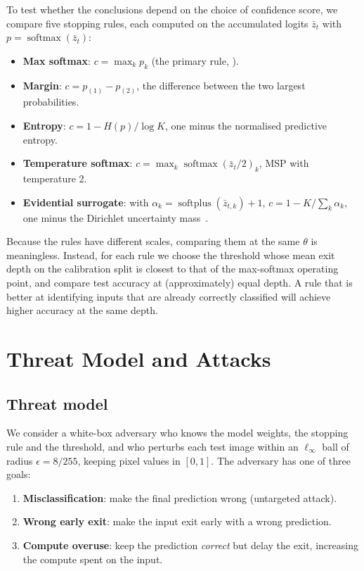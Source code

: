To test whether the conclusions depend on the choice of confidence score, we compare five stopping rules, each computed on the accumulated logits $\bar{z}_t$ with $p = \operatorname{softmax}(\bar{z}_t)$:

\begin{itemize}
    \item \textbf{Max softmax}: $c = \max_k p_k$ (the primary rule, ).
    \item \textbf{Margin}: $c = p_{(1)} - p_{(2)}$, the difference between the two largest probabilities.
    \item \textbf{Entropy}: $c = 1 - H(p) / \log K$, one minus the normalised predictive entropy.
    \item \textbf{Temperature softmax}: $c = \max_k \operatorname{softmax}(\bar{z}_t / 2)_k$, MSP with temperature 2.
    \item \textbf{Evidential surrogate}: with $\alpha_k = \operatorname{softplus}(\bar{z}_{t,k}) + 1$, $c = 1 - K / \sum_k \alpha_k$, one minus the Dirichlet uncertainty mass~\cite{sensoy2018evidential}.
\end{itemize}

Because the rules have different scales, comparing them at the same $\theta$ is meaningless. Instead, for each rule we choose the threshold whose mean exit depth on the calibration split is closest to that of the max-softmax operating point, and compare test accuracy at (approximately) equal depth. A rule that is better at identifying inputs that are already correctly classified will achieve higher accuracy at the same depth.

\section{Threat Model and Attacks}
\label{sec:meth-attacks}

\subsection{Threat model}

We consider a white-box adversary who knows the model weights, the stopping rule and the threshold, and who perturbs each test image within an $\ell_\infty$ ball of radius $\epsilon = 8/255$, keeping pixel values in $[0, 1]$. The adversary has one of three goals:

\begin{enumerate}
    \item \textbf{Misclassification}: make the final prediction wrong (untargeted attack).
    \item \textbf{Wrong early exit}: make the input exit early with a wrong prediction.
    \item \textbf{Compute overuse}: keep the prediction \emph{correct} but delay the exit, increasing the compute spent on the input.
\end{enumerate}

